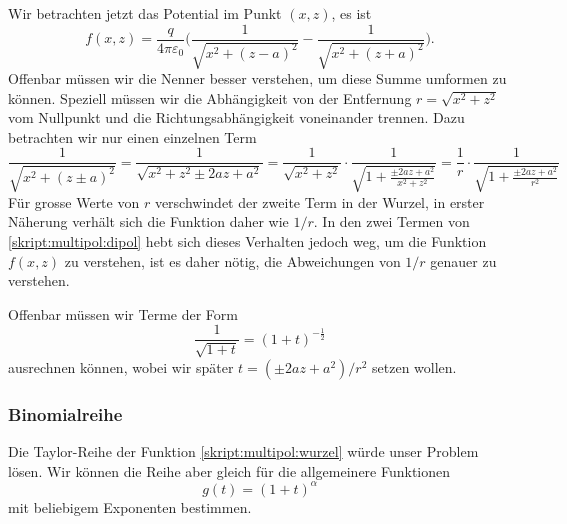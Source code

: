 Wir betrachten jetzt das Potential im Punkt $(x,z)$, es ist
\begin{equation}
f(x,z)
=
\frac{q}{4\pi\varepsilon_0}
\biggl(
\frac{1}{\sqrt{x^2 + (z-a)^2}}
-
\frac{1}{\sqrt{x^2 + (z+a)^2}}
\biggr).
\label{skript:multipol:dipol}
\end{equation}
Offenbar müssen wir die Nenner besser verstehen, um diese Summe 
umformen zu können.
Speziell müssen wir die Abhängigkeit von der Entfernung
$r=\sqrt{x^2+z^2}$ vom Nullpunkt
und die Richtungsabhängigkeit voneinander trennen.
Dazu betrachten wir nur einen einzelnen Term
\[
\frac{1}{\sqrt{x^2+(z\pm a)^2}}
=
\frac{1}{\sqrt{x^2+z^2\pm 2az+a^2}}
=
\frac{1}{\sqrt{x^2+z^2}} \cdot \frac{1}{\sqrt{\displaystyle 1+\frac{\pm 2az+a^2}{x^2+z^2}}}
=
\frac{1}{r} \cdot \frac{1}{\sqrt{\displaystyle 1+\frac{\pm 2az+a^2}{r^2}}}
\]
Für grosse Werte von $r$ verschwindet der zweite Term in der Wurzel,
in erster Näherung verhält sich die Funktion daher wie $1/r$.
In den zwei Termen von \eqref{skript:multipol:dipol} hebt sich dieses
Verhalten jedoch weg, um die Funktion $f(x,z)$ zu verstehen, ist es
daher nötig, die Abweichungen von $1/r$ genauer zu verstehen.

Offenbar müssen wir Terme der Form
\begin{equation}
\frac{1}{\sqrt{1+t}}
=
(1+t)^{-\frac12}
\label{skript:multipol:wurzel}
\end{equation}
ausrechnen können, wobei wir später $t=(\pm2az+a^2)/r^2$ setzen wollen.

\subsubsection{Binomialreihe%
\label{skript:multipol:binomialreihe}}
Die Taylor-Reihe der Funktion \eqref{skript:multipol:wurzel}
würde unser Problem lösen. 
Wir können die Reihe aber gleich für die
allgemeinere Funktionen
\begin{equation}
g(t)=(1+t)^\alpha
\end{equation}
mit beliebigem Exponenten bestimmen.

